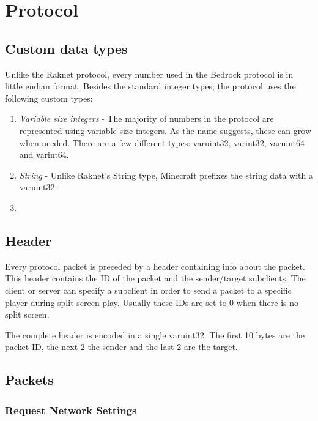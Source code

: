 \chapter{Protocol}\label{chap:protocol}

\section{Custom data types}\label{sec:protocol-types}

Unlike the Raknet protocol, every number used in the Bedrock protocol is in little endian format.
Besides the standard integer types, the protocol uses the following custom types:
\begin{enumerate}
    \item \textit{Variable size integers} - The majority of numbers in the protocol are represented using variable size integers.
        As the name suggests, these can grow when needed.
        There are a few different types: varuint32, varint32, varuint64 and varint64.
    \item \textit{String} - Unlike Raknet's String type, Minecraft prefixes the string data with a varuint32.
    \item 
\end{enumerate}

\section{Header}\label{sec:protocol-header}

Every protocol packet is preceded by a header containing info about the packet.
This header contains the ID of the packet and the sender/target subclients.
The client or server can specify a subclient in order to send a packet to a specific player during split screen play.
Usually these IDs are set to 0 when there is no split screen.

The complete header is encoded in a single varuint32.
The first 10 bytes are the packet ID, the next 2 the sender and the last 2 are the target.

\section{Packets}\label{sec:protocol-packets}

\subsection{Request Network Settings}\label{subsec:request-network-settings}

